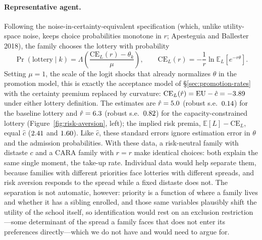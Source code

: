\documentclass{article}
\begin{document}
\paragraph{Representative agent.} Following the noise-in-certainty-equivalent specification (which, unlike utility-space noise, keeps choice probabilities monotone in $r$; Apesteguia and Ballester 2018), the family chooses the lottery with probability
\[
\Pr(\text{lottery} \mid k) = \Lambda\left( \frac{\mathrm{CE}_L(r) - \theta_k}{\mu} \right), \qquad \mathrm{CE}_L(r) = -\frac{1}{r} \ln \mathbb{E}_L\left[ e^{-r \theta} \right].
\]
Setting $\mu = 1$, the scale of the logit shocks that already normalizes $\theta$ in the promotion model, this is exactly the acceptance model of \S\ref{sec:promotion-rates} with the certainty premium replaced by curvature: $\mathrm{CE}_L(\hat r) = \mathrm{EU} - \hat c = -3.89$ under either lottery definition. The estimates are $\hat r = 5.0$ (robust s.e.\ $0.14$) for the baseline lottery and $\hat r = 6.3$ (robust s.e.\ $0.82$) for the capacity-constrained lottery (Figure~\ref{fig:risk-aversion}, left); the implied risk premia, $\mathbb{E}[L] - \mathrm{CE}_L$, equal $\hat c$ ($2.41$ and $1.60$). Like $\hat c$, these standard errors ignore estimation error in $\theta$ and the admission probabilities. With these data, a risk-neutral family with distaste $c$ and a CARA family with $r = \hat r$ make identical choices: both explain the same single moment, the \numTakeup{} take-up rate. Individual data would help separate them, because families with different priorities face lotteries with different spreads, and risk aversion responds to the spread while a fixed distaste does not. The separation is not automatic, however: priority is a function of where a family lives and whether it has a sibling enrolled, and those same variables plausibly shift the utility of the school itself, so identification would rest on an exclusion restriction---some determinant of the spread a family faces that does not enter its preferences directly---which we do not have and would need to argue for.
\end{document}
